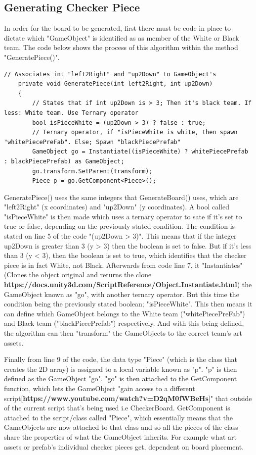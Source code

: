 \documentclass[10pt, a4paper]{article}
\begin{document}
	 \subsection{Generating Checker Piece}
	 In order for the board to be generated, first there must be code in place to dictate which "GameObject" is identified as as member of the White or Black team. The code below shows the process of this algorithm within the method "GeneratePiece()".
	 \\	 
	 \begin{lstlisting}[caption = GeneratePiece()]
	 // Associates int "left2Right" and "up2Down" to GameObject's
    private void GeneratePiece(int left2Right, int up2Down)
    {
        // States that if int up2Down is > 3; Then it's black team. If less: White team. Use Ternary operator
        bool isPieceWhite = (up2Down > 3) ? false : true;
        // Ternary operator, if "isPieceWhite is white, then spawn "whitePiecePreFab". Else; Spawn "blackPiecePrefab"
        GameObject go = Instantiate((isPieceWhite) ? whitePiecePrefab : blackPiecePrefab) as GameObject;
        go.transform.SetParent(transform);
        Piece p = go.GetComponent<Piece>();      
	 \end{lstlisting}
	 GeneratePiece() uses the same integers that GenerateBoard() uses, which are "left2Right" (x coordinates) and "up2Down" (y coordinates). A bool called "isPieceWhite" is then made which uses a ternary operator to sate if it's set to true or false, depending on the previously stated condition. The condition is stated on line 5 of the code "(up2Down > 3)". This means that if the integer up2Down is greater than 3 (y > 3) then the boolean is set to false. But if it's less than 3 (y < 3), then the boolean is set to true, which identifies that the checker piece is in fact White, not Black. Afterwards from code line 7, it "Instantiates" (Clones the object original and returns the clone \textbf{https://docs.unity3d.com/ScriptReference/Object.Instantiate.html}) the GameObject known as "go", with another ternary operator. But this time the condition being the previously stated boolean; "isPieceWhite". This then means it can define which GameObject belongs to the White team ("whitePiecePreFab") and Black team ("blackPiecePrefab") respectively. And with this being defined, the algorithm can then "transform" the GameObjects to the correct team's art assets.
	 
	 Finally from line 9 of the code, the data type "Piece" (which is the class that creates the 2D array) is assigned to a local variable known as "p". "p" is then defined as the GameObject "go". "go" is then attached to the GetComponent function, which lets the GameObject "gain access to a different script[\textbf{https://www.youtube.com/watch?v=D2qM0fWBeHs}]" that outside of the current script that's being used i.e CheckerBoard. GetComponent is attached to the script/class called "Piece", which essentially means that the GameObjects are now attached to that class and so all the pieces of the class share the properties of what the GameObject inherits. For example what art assets or prefab's individual checker pieces get, dependent on board placement.
	 
\end{document}
